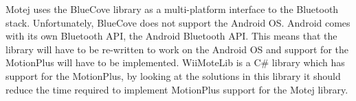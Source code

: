 Motej uses the BlueCove library as a multi-platform interface to the Bluetooth stack. Unfortunately, BlueCove does not support the Android OS. Android comes with its own Bluetooth API, the Android Bluetooth API. This means that the library will have to be re-written to work on the Android OS and support for the MotionPlus will have to be implemented. WiiMoteLib\cite{wiiMoteLib} is a C\# library which has support for the MotionPlus, by looking at the solutions in this library it should reduce the time required to implement MotionPlus support for the Motej library.
